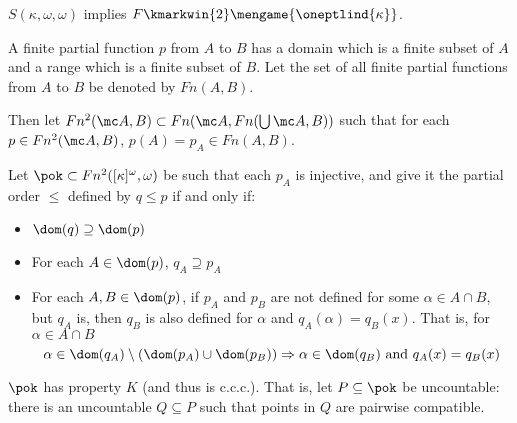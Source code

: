   \begin{cor}
    $S(\kappa,\omega,\omega)$ implies $F\kmarkwin{2}\mengame{\oneptlind{\kappa}}$.
  \end{cor}

  \begin{defn}
    A finite partial function $p$ from $A$ to $B$ has a domain which is a finite subset of $A$ and a range which is a finite subset of $B$. Let the set of all finite partial functions from $A$ to $B$ be denoted by $Fn(A,B)$.

    Then let $Fn^2(\mc A,B)\subset Fn(\mc A,Fn(\bigcup \mc A,B))$ such that for each $p\in Fn^2(\mc A,B)$, $p(A)=p_A\in Fn(A,B)$.
  \end{defn}

  \begin{defn}
    Let $\pok\subset Fn^2([\kappa]^\omega,\omega)$ be such that each $p_A$ is injective, and give it the partial order $\leq$ defined by $q\leq p$ if and only if:
          \begin{itemize}
            \item $\dom(q)\supseteq\dom(p)$
            \item For each $A\in\dom(p)$, $q_A\supseteq p_A$
            \item For each $A,B\in\dom(p)$, if $p_A$ and $p_B$ are not defined for some $\alpha\in A\cap B$, but $q_A$ is, then $q_B$ is also defined for $\alpha$ and $q_A(\alpha)=q_B(x)$. That is, for $\alpha\in A\cap B$ 
              \[
                \alpha\in\dom(q_A)\setminus(\dom(p_A)\cup\dom(p_B))
                \Rightarrow
                \alpha\in\dom(q_B) \text{ and } q_A(x)=q_B(x)
              \]
          \end{itemize}
  \end{defn}

  \begin{lem}
    $\pok$ has property $K$ (and thus is c.c.c.). That is, let $P\subseteq\pok$ be uncountable: there is an uncountable $Q\subseteq P$ such that points in $Q$ are pairwise compatible.
  \end{lem}

